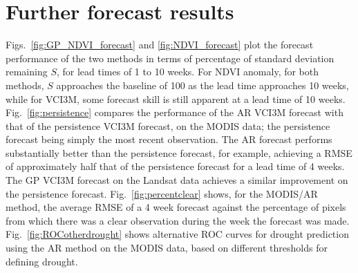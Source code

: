 \documentclass[review]{elsarticle}
\begin{document}





\newpage

\section{Further forecast results}

Figs.~\ref{fig:GP_NDVI_forecast} and \ref{fig:NDVI_forecast} plot the forecast performance of the two methods in terms of percentage of standard deviation remaining $S$, for lead times of 1 to 10 weeks. For NDVI anomaly, for both methods, $S$ approaches the baseline of 100 as the lead time approaches 10 weeks, while for VCI3M, some forecast skill is still apparent at a lead time of 10 weeks. Fig.~\ref{fig:persistence} compares the performance of the AR VCI3M forecast with that of the persistence VCI3M forecast, on the MODIS data; the persistence forecast being simply the most recent observation. The AR forecast performs substantially better than the persistence forecast, for example, achieving a RMSE of approximately half that of the persistence forecast for a lead time of 4 weeks. The GP VCI3M forecast on the Landsat data achieves a similar improvement on the persistence forecast. Fig.~\ref{fig:percentclear} shows, for the MODIS/AR method, the average RMSE of a 4 week forecast against the percentage of pixels from which there was a clear observation during the week the forecast was made. Fig.~\ref{fig:ROCotherdrought} shows alternative ROC curves for drought prediction using the AR method on the MODIS data, based on different thresholds for defining drought.
\end{document}
